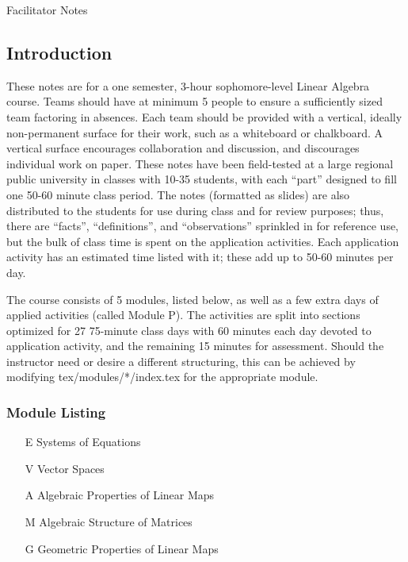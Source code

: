 \documentclass{article}
\begin{document}
\begin{center}
{\Large Facilitator Notes}
\end{center}

\subsection*{Introduction}

These notes are for a one semester, 3-hour sophomore-level Linear Algebra course.  Teams should have at minimum 5 people to ensure a sufficiently sized team factoring in absences.  Each team should be provided with a vertical, ideally non-permanent surface for their work, such as a whiteboard or chalkboard.  A vertical surface encourages collaboration and discussion, and discourages individual work on paper.  These notes have been field-tested at a large regional public university in classes with 10-35 students, with each ``part'' designed to fill one 50-60 minute class period.  The notes (formatted as slides) are also distributed to the students for use during class and for review purposes; thus, there are ``facts'', ``definitions'', and ``observations'' sprinkled in for reference use, but the bulk of class time is spent on the application activities.  Each application activity has an estimated time listed with it; these add up to 50-60 minutes per day.

The course consists of 5 modules, listed below, as well as a few extra days of applied activities (called Module P). The activities are split into sections optimized for 27 75-minute class days with 60 minutes each day devoted to application activity, and the remaining 15 minutes for assessment.  Should the instructor need or desire a different structuring, this can be achieved by modifying tex/modules/*/index.tex for the appropriate module.

\subsubsection*{Module Listing}
\begin{enumerate}
\item [E] Systems of Equations
\item [V] Vector Spaces
\item [A] Algebraic Properties of Linear Maps
\item [M] Algebraic Structure of Matrices
\item [G] Geometric Properties of Linear Maps
\end{enumerate}
\end{document}
